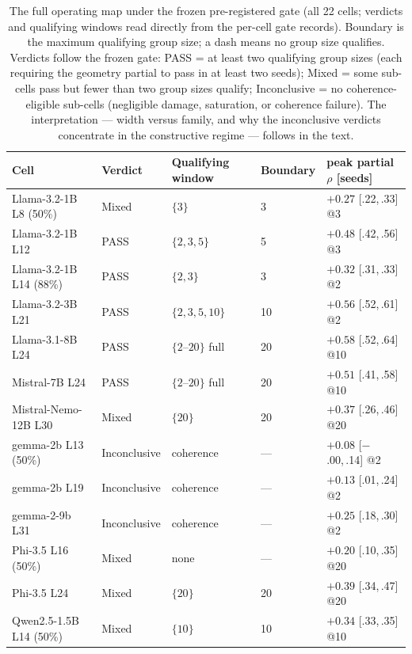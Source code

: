 \documentclass[preprint,12pt]{elsarticle}
\begin{document}
\begin{table}[htbp]
\centering
\caption{The full operating map under the frozen pre-registered gate (all 22 cells;
verdicts and qualifying windows read directly from the per-cell gate records). Boundary
is the maximum qualifying group size; a dash means no group size qualifies. Verdicts
follow the frozen gate: PASS = at least two qualifying group sizes (each requiring the
geometry partial to pass in at least two seeds); Mixed = some sub-cells pass but fewer
than two group sizes qualify; Inconclusive = no coherence-eligible sub-cells (negligible
damage, saturation, or coherence failure). The interpretation --- width versus family,
and why the inconclusive verdicts concentrate in the constructive regime --- follows in
the text.}
\label{tab:width}
{\scriptsize
\setlength{\tabcolsep}{3.5pt}
\begin{tabular}{lllll}
\toprule
Cell & Verdict & Qualifying window & Boundary & peak partial $\rho$ [seeds] \\
\midrule
Llama-3.2-1B L8 (50\%) & Mixed & $\{3\}$ & 3 & $+0.27$ {\scriptsize[.22,\,.33]} @3 \\
Llama-3.2-1B L12 & PASS & $\{2,3,5\}$ & 5 & $+0.48$ {\scriptsize[.42,\,.56]} @3 \\
Llama-3.2-1B L14 (88\%) & PASS & $\{2,3\}$ & 3 & $+0.32$ {\scriptsize[.31,\,.33]} @2 \\
Llama-3.2-3B L21 & PASS & $\{2,3,5,10\}$ & 10 & $+0.56$ {\scriptsize[.52,\,.61]} @2 \\
Llama-3.1-8B L24 & PASS & $\{2\text{--}20\}$ full & 20 & $+0.58$ {\scriptsize[.52,\,.64]} @10 \\
Mistral-7B L24   & PASS & $\{2\text{--}20\}$ full & 20 & $+0.51$ {\scriptsize[.41,\,.58]} @10 \\
Mistral-Nemo-12B L30 & Mixed & $\{20\}$ & 20 & $+0.37$ {\scriptsize[.26,\,.46]} @20 \\
gemma-2b L13 (50\%) & Inconclusive & coherence & --- & $+0.08$ {\scriptsize[$-$.00,\,.14]} @2 \\
gemma-2b L19 & Inconclusive & coherence & --- & $+0.13$ {\scriptsize[.01,\,.24]} @2 \\
gemma-2-9b L31   & Inconclusive & coherence & --- & $+0.25$ {\scriptsize[.18,\,.30]} @2 \\
Phi-3.5 L16 (50\%) & Mixed & none & --- & $+0.20$ {\scriptsize[.10,\,.35]} @20 \\
Phi-3.5 L24 & Mixed & $\{20\}$ & 20 & $+0.39$ {\scriptsize[.34,\,.47]} @20 \\
Qwen2.5-1.5B L14 (50\%) & Mixed & $\{10\}$ & 10 & $+0.34$ {\scriptsize[.33,\,.35]} @10 \\

\end{tabular}}
\end{table}
\end{document}

